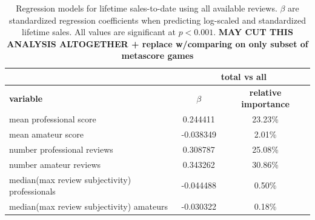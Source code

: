\documentclass[letterpaper]{article}
\begin{document}
\begin{table}[tb]
\centering
\scriptsize
\begin{tabularx}{\linewidth}{|X|c|c|}
\hline  & \multicolumn{2}{|c|}{\textbf{total vs all}}\\ 
\hline \textbf{variable} & \textbf{$\beta$} & \textbf{relative importance}\\ 
\hline mean professional score & 0.244411 & 23.23\%\\ 
\hline mean amateur score & -0.038349 & 2.01\%\\ 
\hline number professional reviews & 0.308787 & 25.08\%\\ 
\hline number amateur reviews & 0.343262 & 30.86\%\\  
\hline median(max review subjectivity) professionals & -0.044488 & 0.50\%\\ 
\hline median(max review subjectivity) amateurs & -0.030322 & 0.18\%\\ 
\hline 
\end{tabularx}
\caption{Regression models for lifetime sales-to-date using all available reviews. $\beta$ are standardized regression coefficients when predicting log-scaled and standardized lifetime sales. All values are significant at $p < 0.001$. \textbf{MAY CUT THIS ANALYSIS ALTOGETHER + replace w/comparing on only subset of metascore games}}
\label{tab:sales_totsale_lm}
\end{table}

\end{document}
